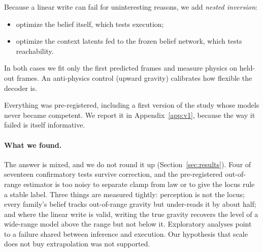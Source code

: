 Because a linear write can fail for uninteresting reasons, we add \emph{nested inversion}:
\begin{itemize}
\item optimize the belief itself, which tests execution;
\item optimize the context latents fed to the frozen belief network, which tests reachability.
\end{itemize}
In both cases we fit only the first predicted frames and measure physics on held-out frames. An
anti-physics control (upward gravity) calibrates how flexible the decoder is.

Everything was pre-registered, including a first version of the study whose models never became
competent. We report it in Appendix~\ref{app:v1}, because the way it failed is itself informative.

\paragraph{What we found.} The answer is mixed, and we do not round it up
(Section~\ref{sec:results}). Four of seventeen confirmatory tests survive correction, and the
pre-registered out-of-range estimator is too noisy to separate clamp from law or to give the locus
rule a stable label. Three things are measured tightly: perception is not the locus; every
family's belief tracks out-of-range gravity but under-reads it by about half; and where the linear
write is valid, writing the true gravity recovers the level of a wide-range model above the range
but not below it. Exploratory analyses point to a failure shared between inference and execution.
Our hypothesis that scale does not buy extrapolation was not supported.
